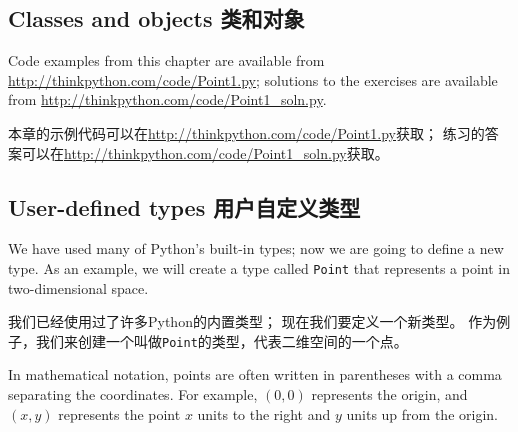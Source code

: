 \documentclass[10pt]{book}
\begin{document}
\begin{CJK}{UTF8}{gbsn}





\chapter{Classes and objects 类和对象}

Code examples from this chapter are available from
\url{http://thinkpython.com/code/Point1.py}; solutions
to the exercises are available from
\url{http://thinkpython.com/code/Point1_soln.py}.

本章的示例代码可以在\url{http://thinkpython.com/code/Point1.py}获取；
练习的答案可以在\url{http://thinkpython.com/code/Point1_soln.py}获取。

\section{User-defined types 用户自定义类型}
\label{point}

We have used many of Python's built-in types; now we are going
to define a new type.  As an example, we will create a type
called {\tt Point} that represents a point in two-dimensional
space.

我们已经使用过了许多Python的内置类型；
现在我们要定义一个新类型。
作为例子，我们来创建一个叫做{\tt Point}的类型，代表二维空间的一个点。

In mathematical notation, points are often written in
parentheses with a comma separating the coordinates. For example,
$(0,0)$ represents the origin, and $(x,y)$ represents the
point $x$ units to the right and $y$ units up from the origin.


\end{CJK}
\end{document}
